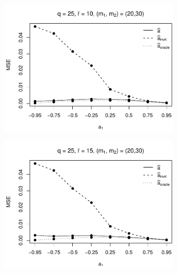 \begin{figure}[p]
\begin{subfigure}[b]{0.45\textwidth}
\includegraphics[width=\textwidth]{Plots/Robustness/MSE_a1_T=500_slope=10_(q,r,M1,M2)=(25,10,20,30).pdf}
\end{subfigure}
\hspace{0.25cm}
\begin{subfigure}[b]{0.45\textwidth}
\includegraphics[width=\textwidth]{Plots/Robustness/MSE_a1_T=500_slope=10_(q,r,M1,M2)=(25,15,20,30).pdf}
\end{subfigure}


\end{figure}
